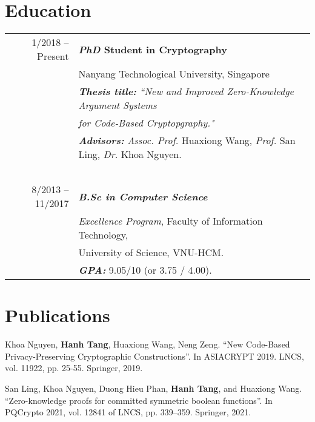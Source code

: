 \documentclass[a4paper, 11pt]{article}
\begin{document}
	\section{Education}
	\begin{tabular}{rl}	
		1/2018 -- Present & \textbf{\textit{PhD} Student in Cryptography} \\
		& Nanyang Technological University, Singapore   \\
		\ & \textbf{\textit{Thesis title:}} \textit{``New and Improved Zero-Knowledge Argument Systems}\\&\textit{           for Code-Based Cryptopgraphy."}\\
		
		\ & \textbf{\textit{Advisors:}} \textit{Assoc. Prof.} Huaxiong Wang, \textit{Prof.} San Ling, \textit{Dr.} Khoa Nguyen.\\
		\ & \ \\
		8/2013 -- 11/2017 & \textbf{\textit{B.Sc in Computer Science}} \\ 
		& \textit{Excellence Program}, Faculty of Information Technology,\\ &University of Science, VNU-HCM.\\
		\ & \textbf{\textit{GPA:}} 9.05/10 (or 3.75 / 4.00).
	\end{tabular}
	
	\section{Publications}
	Khoa Nguyen, \textbf{Hanh Tang}, Huaxiong Wang, Neng Zeng. ``New Code-Based Privacy-Preserving Cryptographic Constructions''. In ASIACRYPT 2019. LNCS, vol. 11922, pp. 25-55. Springer, 2019.
	
	San Ling, Khoa Nguyen, Duong Hieu Phan, \textbf{Hanh Tang}, and Huaxiong Wang. ``Zero-knowledge
	proofs for committed symmetric boolean functions''. In PQCrypto 2021,
	vol. 12841 of LNCS, pp. 339–359. Springer, 2021.
	
\end{document}

